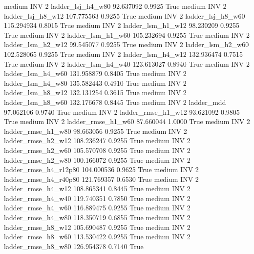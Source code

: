     medium      INV                 2      ladder_lsj_h4_w80  92.637092      0.9925    True
    medium      INV                 2      ladder_lsj_h8_w12 107.775563      0.9255    True
    medium      INV                 2      ladder_lsj_h8_w60 115.294934      0.8015    True
    medium      INV                 2      ladder_lsm_h1_w12  98.230209      0.9255    True
    medium      INV                 2      ladder_lsm_h1_w60 105.232694      0.9255    True
    medium      INV                 2      ladder_lsm_h2_w12  99.545077      0.9255    True
    medium      INV                 2      ladder_lsm_h2_w60 102.528065      0.9255    True
    medium      INV                 2      ladder_lsm_h4_w12 132.936474      0.7515    True
    medium      INV                 2      ladder_lsm_h4_w40 123.613027      0.8940    True
    medium      INV                 2      ladder_lsm_h4_w60 131.958879      0.8405    True
    medium      INV                 2      ladder_lsm_h4_w80 135.582443      0.4910    True
    medium      INV                 2      ladder_lsm_h8_w12 132.131254      0.3615    True
    medium      INV                 2      ladder_lsm_h8_w60 132.176678      0.8445    True
    medium      INV                 2             ladder_mdd  97.062106      0.9740    True
    medium      INV                 2     ladder_rmse_h1_w12  93.621092      0.9805    True
    medium      INV                 2     ladder_rmse_h1_w60  87.660044      1.0000    True
    medium      INV                 2     ladder_rmse_h1_w80  98.663056      0.9255    True
    medium      INV                 2     ladder_rmse_h2_w12 108.236247      0.9255    True
    medium      INV                 2     ladder_rmse_h2_w60 105.570708      0.9255    True
    medium      INV                 2     ladder_rmse_h2_w80 100.166072      0.9255    True
    medium      INV                 2  ladder_rmse_h4_r12p80 104.000536      0.9625    True
    medium      INV                 2  ladder_rmse_h4_r40p80 121.769357      0.6530    True
    medium      INV                 2     ladder_rmse_h4_w12 108.865341      0.8445    True
    medium      INV                 2     ladder_rmse_h4_w40 119.740351      0.7850    True
    medium      INV                 2     ladder_rmse_h4_w60 116.889475      0.9255    True
    medium      INV                 2     ladder_rmse_h4_w80 118.350719      0.6855    True
    medium      INV                 2     ladder_rmse_h8_w12 105.690487      0.9255    True
    medium      INV                 2     ladder_rmse_h8_w60 113.530422      0.9255    True
    medium      INV                 2     ladder_rmse_h8_w80 126.954378      0.7140    True
